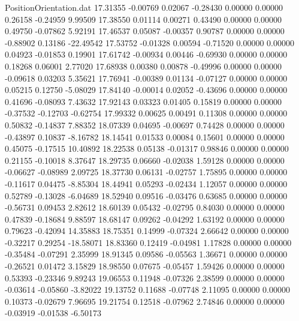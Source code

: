 \begin{filecontents}{PositionOrientation.dat}
  17.31355   -0.00769    0.02067    -0.28430    0.00000    0.00000    0.26158   -0.24959    9.99509
  17.38550    0.01114    0.00271     0.43490    0.00000    0.00000    0.49750   -0.07862    5.92191
  17.46537    0.05087   -0.00357     0.90787    0.00000    0.00000   -0.88902    0.13186  -22.49542
  17.53752   -0.01328    0.00594    -0.71520    0.00000    0.00000    0.04923   -0.01853    0.19901
  17.61742   -0.00934    0.00446    -0.69930    0.00000    0.00000    0.18268    0.06001    2.77020
  17.68938    0.00380    0.00878    -0.49996    0.00000    0.00000   -0.09618    0.03203    5.35621
  17.76941   -0.00389    0.01134    -0.07127    0.00000    0.00000    0.05215    0.12750   -5.08029
  17.84140   -0.00014    0.02052    -0.43696    0.00000    0.00000    0.41696   -0.08093    7.43632
  17.92143    0.03323    0.01405     0.15819    0.00000    0.00000   -0.37532   -0.12703   -0.62754
  17.99332    0.00625    0.00491     0.11308    0.00000    0.00000    0.50832   -0.14837    7.88352
  18.07339    0.04695   -0.00697     0.74428    0.00000    0.00000   -0.43897    0.10837   -8.16782
  18.14541    0.01533    0.00084     0.15601    0.00000    0.00000    0.45075   -0.17515   10.40892
  18.22538    0.05138   -0.01317     0.98846    0.00000    0.00000    0.21155   -0.10018    8.37647
  18.29735    0.06660   -0.02038     1.59128    0.00000    0.00000   -0.06627   -0.08989    2.09725
  18.37730    0.06131   -0.02757     1.75895    0.00000    0.00000   -0.11617    0.04475   -8.85304
  18.44941    0.05293   -0.02434     1.12057    0.00000    0.00000    0.52789   -0.13028   -6.04689
  18.52940    0.09516   -0.03476     0.63685    0.00000    0.00000   -0.56731    0.09453    2.82612
  18.60139    0.05432   -0.02795     0.84030    0.00000    0.00000    0.47839   -0.18684    9.88597
  18.68147    0.09262   -0.04292     1.63192    0.00000    0.00000    0.79623   -0.42094   14.35883
  18.75351    0.14999   -0.07324     2.66642    0.00000    0.00000   -0.32217    0.29254  -18.58071
  18.83360    0.12419   -0.04981     1.17828    0.00000    0.00000   -0.35484   -0.07291    2.35999
  18.91345    0.09586   -0.05563     1.36671    0.00000    0.00000   -0.26521    0.01472    3.15829
  18.98550    0.07675   -0.05457     1.59426    0.00000    0.00000    0.53393   -0.23346    9.89243
  19.06553    0.11948   -0.07326     2.38599    0.00000    0.00000   -0.03614   -0.05860   -3.82022
  19.13752    0.11688   -0.07748     2.11095    0.00000    0.00000    0.10373   -0.02679    7.96695
  19.21754    0.12518   -0.07962     2.74846    0.00000    0.00000   -0.03919   -0.01538   -6.50173

\end{filecontents}
